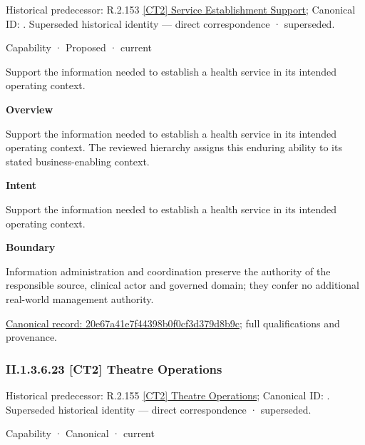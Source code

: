 {\small Historical predecessor: R.2.153 \hyperref[element:8a63b08f34fa42c5bda2a3e12b9ecd55]{[CT2] Service Establishment Support}; Canonical ID: \texttt{}. Superseded historical identity — direct correspondence · superseded.}\par
\label{element:20e67a41e7f44398b0f0cf3d379d8b9c}
{\small Capability · Proposed · current}\par

Support the information needed to establish a health service in its intended operating context.



\textbf{Overview}



Support the information needed to establish a health service in its intended operating context. The reviewed hierarchy assigns this enduring ability to its stated business-enabling context.



\textbf{Intent}



Support the information needed to establish a health service in its intended operating context.



\textbf{Boundary}



Information administration and coordination preserve the authority of the responsible source, clinical actor and governed domain; they confer no additional real-world management authority.


{\footnotesize \href{../../../../../../../continuum/strategy/capability/20e67a41e7f44398b0f0cf3d379d8b9c.md}{Canonical record: 20e67a41e7f44398b0f0cf3d379d8b9c}; full qualifications and provenance.}\par
\subsubsection*{II.1.3.6.23 [CT2] Theatre Operations}
\label{navigation:II.1.3.6.23}

{\small Historical predecessor: R.2.155 \hyperref[element:9ac72fea821c45e2b18632ae9a9867dd]{[CT2] Theatre Operations}; Canonical ID: \texttt{}. Superseded historical identity — direct correspondence · superseded.}\par
\label{element:4bf7a8260e1444fdac44e97c3557b533}
{\small Capability · Canonical · current}\par

